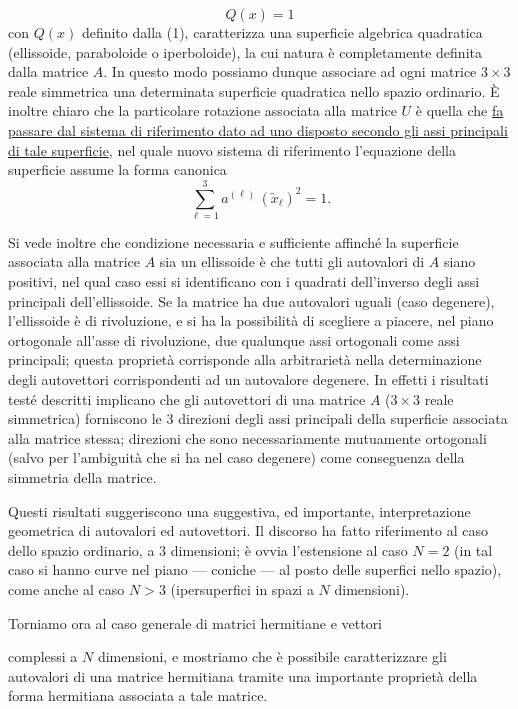 \documentclass[11pt, a4paper]{book}
\numberwithin{equation}{section}
\begin{document}
\begin{equation}
Q(x) = 1
\end{equation}
con $Q(x)$ definito dalla (1), caratterizza una superficie algebrica
quadratica (ellissoide, paraboloide o iperboloide), la cui natura è
completamente definita dalla matrice $A$. In questo modo possiamo dunque
associare ad ogni matrice $3\times3$ reale simmetrica una determinata
superficie quadratica nello spazio ordinario. È inoltre chiaro che la
particolare rotazione associata alla matrice $U$ è quella che \uline{fa
passare dal sistema di riferimento dato ad uno disposto secondo gli assi
principali di tale superficie}, nel quale nuovo sistema di riferimento
l'equazione della superficie assume la forma canonica
\begin{equation}
\sum_{\ell=1}^{3} a^{(\ell)}\,(\widetilde{x}_\ell)^2 = 1.
\end{equation}

Si vede inoltre che condizione necessaria e sufficiente affinché la
superficie associata alla matrice $A$ sia un ellissoide è che tutti gli
autovalori di $A$ siano positivi, nel qual caso essi si identificano con i
quadrati dell'inverso degli assi principali dell'ellissoide. Se la matrice
ha due autovalori uguali (caso degenere), l'ellissoide è di rivoluzione, e
si ha la possibilità di scegliere a piacere, nel piano ortogonale all'asse
di rivoluzione, due qualunque assi ortogonali come assi principali; questa
proprietà corrisponde alla arbitrarietà nella determinazione degli
autovettori corrispondenti ad un autovalore degenere. In effetti i risultati
testé descritti implicano che gli autovettori di una matrice $A$ ($3\times3$
reale simmetrica) forniscono le 3 direzioni degli assi principali della
superficie associata alla matrice stessa; direzioni che sono necessariamente
mutuamente ortogonali (salvo per l'ambiguità che si ha nel caso degenere)
come conseguenza della simmetria della matrice.

Questi risultati suggeriscono una suggestiva, ed importante,
interpretazione geometrica di autovalori ed autovettori. Il discorso ha
fatto riferimento al caso dello spazio ordinario, a 3 dimensioni; è ovvia
l'estensione al caso $N=2$ (in tal caso si hanno curve nel piano --- coniche
--- al posto delle superfici nello spazio), come anche al caso $N > 3$
(ipersuperfici in spazi a $N$ dimensioni).

Torniamo ora al caso generale di matrici hermitiane e vettori %

complessi a $N$ dimensioni, e mostriamo che è possibile caratterizzare gli
autovalori di una matrice hermitiana tramite una importante proprietà della
forma hermitiana associata a tale matrice.
\end{document}
